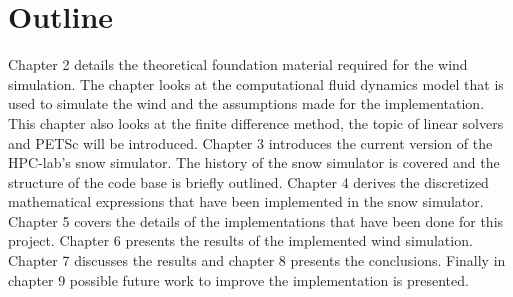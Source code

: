 \section{Outline}

Chapter 2 details the theoretical foundation material required for the wind
simulation. The chapter looks at the computational fluid dynamics model that is
used to simulate the wind and the assumptions made for the implementation. This
chapter also looks at the finite difference method, the topic of linear solvers
and PETSc will be introduced. Chapter 3 introduces the current version of the
HPC-lab's snow simulator. The history of the snow simulator is covered and the
structure of the code base is briefly outlined. Chapter 4 derives the
discretized mathematical expressions that have been implemented in the snow
simulator. Chapter 5 covers the details of the implementations that have been
done for this project. Chapter 6 presents the results of the implemented wind
simulation. Chapter 7 discusses the results and chapter 8 presents the
conclusions. Finally in chapter 9 possible future work to improve the
implementation is presented.

